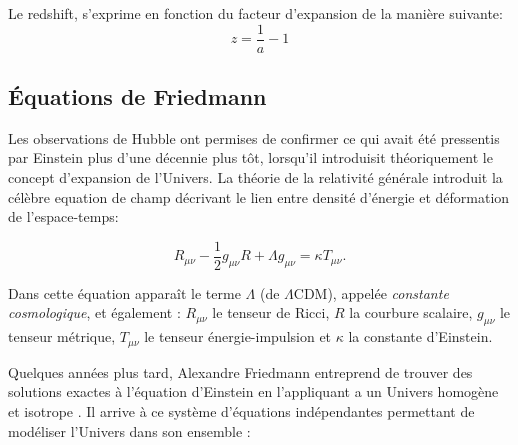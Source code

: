 Le redshift, s'exprime en fonction du facteur d'expansion de la manière suivante:
\begin{equation}
z= \frac{1}{a}-1
\end{equation}

\subsection{Équations de Friedmann}
\label{sec:friedman}

Les observations de Hubble ont permises de confirmer ce qui avait été pressentis par Einstein plus d'une décennie plus tôt, lorsqu'il introduisit théoriquement le concept d'expansion de l'Univers. 
La théorie de la relativité générale \citep{1916AnP...354..769E} introduit la célèbre equation de champ décrivant le lien entre densité d'énergie et déformation de l'espace-temps:

\begin{equation}
R_{\mu\nu} - \frac{1}{2} g_{\mu\nu}R + \Lambda g_{\mu\nu}  = \kappa T_{\mu\nu}.
\label{eq:einstein}
\end{equation} 

Dans cette équation apparaît le terme $\Lambda$ (de $\Lambda$CDM), appelée \textit{constante cosmologique}, et également :
$R_{\mu \nu}$ le tenseur de Ricci, $R$ la courbure scalaire, $g_{\mu \nu}$ le tenseur métrique, $T_{\mu \nu }$ le tenseur énergie-impulsion et $\kappa$ la constante d'Einstein.


Quelques années plus tard, Alexandre Friedmann entreprend de trouver des solutions exactes à l'équation d'Einstein en l'appliquant a un Univers homogène et isotrope \citep{1922ZPhy...10..377F}.
Il arrive à ce système d'équations indépendantes permettant de modéliser l'Univers dans son ensemble :

% 
%
% 
 
